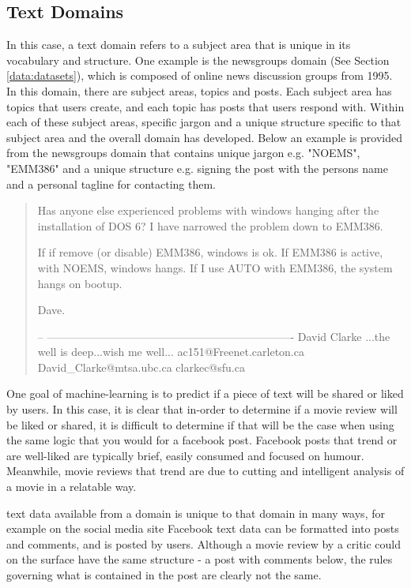 \subsection{Text Domains}

In this case, a text domain refers to a subject area that is unique in its vocabulary and structure. One example is the newsgroups domain (See Section \ref{data:datasets}), which is composed of online news discussion groups from 1995. In this domain, there are subject areas, topics and posts. Each subject area has topics that users create, and each topic has posts that users respond with. Within each of these subject areas, specific jargon and a unique structure specific to that subject area and the overall domain has developed. Below an example is provided from the newsgroups domain that contains unique jargon e.g. "NOEMS", "EMM386" and a unique structure e.g. signing the post with the persons name and a personal tagline for contacting them.


\begin{quote}
Has anyone else experienced problems with windows hanging
after the installation of DOS 6?  I have narrowed the
problem down to EMM386.

If if remove (or disable) EMM386, windows is ok.  If EMM386
is active, with NOEMS, windows hangs.  If I use AUTO with
EMM386, the system hangs on bootup.

Dave.


-- 
-------------------------------------------------------------------
David Clarke   ...the well is deep...wish me well...
ac151@Freenet.carleton.ca  David_Clarke@mtsa.ubc.ca  clarkec@sfu.ca
\end{quote}



One goal of machine-learning is to predict if a piece of text will be shared or liked by users. In this case, it is clear that in-order to determine if a movie review will be liked or shared, it is difficult to determine if that will be the case when using the same logic that you would for a facebook post. Facebook posts that trend or are well-liked are typically brief, easily consumed and focused on humour. Meanwhile, movie reviews that trend are due to cutting and intelligent analysis of a movie in a relatable way. 


 text data available from a domain is unique to that domain in many ways, for example on the social media site Facebook text data can be formatted into posts and comments, and is posted by users. Although a movie review by a critic could on the surface have the same structure - a post with comments below, the rules governing what is contained in the post are clearly not the same. 




